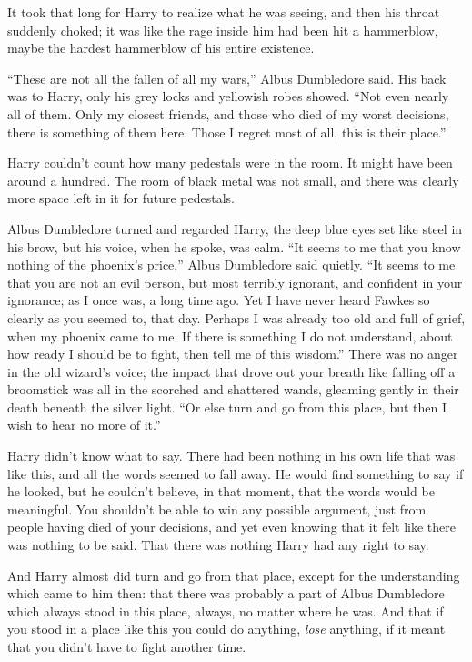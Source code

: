 It took that long for Harry to realize what he was seeing, and then his throat suddenly choked; it was like the rage inside him had been hit a hammerblow, maybe the hardest hammerblow of his entire existence.

``These are not all the fallen of all my wars,'' Albus Dumbledore said. His back was to Harry, only his grey locks and yellowish robes showed. ``Not even nearly all of them. Only my closest friends, and those who died of my worst decisions, there is something of them here. Those I regret most of all, this is their place.''

Harry couldn't count how many pedestals were in the room. It might have been around a hundred. The room of black metal was not small, and there was clearly more space left in it for future pedestals.

Albus Dumbledore turned and regarded Harry, the deep blue eyes set like steel in his brow, but his voice, when he spoke, was calm. ``It seems to me that you know nothing of the phoenix's price,'' Albus Dumbledore said quietly. ``It seems to me that you are not an evil person, but most terribly ignorant, and confident in your ignorance; as I once was, a long time ago. Yet I have never heard Fawkes so clearly as you seemed to, that day. Perhaps I was already too old and full of grief, when my phoenix came to me. If there is something I do not understand, about how ready I should be to fight, then tell me of this wisdom.'' There was no anger in the old wizard's voice; the impact that drove out your breath like falling off a broomstick was all in the scorched and shattered wands, gleaming gently in their death beneath the silver light. ``Or else turn and go from this place, but then I wish to hear no more of it.''

Harry didn't know what to say. There had been nothing in his own life that was like this, and all the words seemed to fall away. He would find something to say if he looked, but he couldn't believe, in that moment, that the words would be meaningful. You shouldn't be able to win any possible argument, just from people having died of your decisions, and yet even knowing that it felt like there was nothing to be said. That there was nothing Harry had any right to say.

And Harry almost did turn and go from that place, except for the understanding which came to him then: that there was probably a part of Albus Dumbledore which always stood in this place, always, no matter where he was. And that if you stood in a place like this you could do anything, \emph{lose} anything, if it meant that you didn't have to fight another time.

